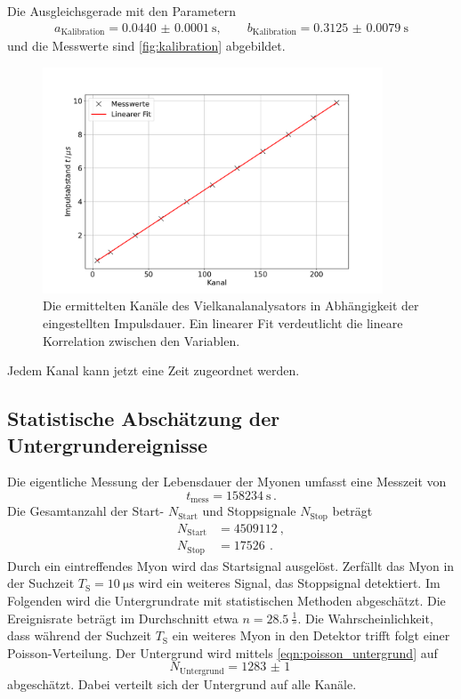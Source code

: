 Die Ausgleichsgerade mit den Parametern
\begin{align*}
    a_\text{Kalibration} = \qty{0.0440(00001)}{\second}, \qquad b_\text{Kalibration} = \qty{0.3125(00079)}{\second}
\end{align*}
und die Messwerte sind \autoref{fig:kalibration} abgebildet.
\begin{figure}
    \centering
    \includegraphics[width=0.9\textwidth]{content/plots/calibration.pdf}
    \caption{Die ermittelten Kanäle des Vielkanalanalysators in Abhängigkeit der eingestellten Impulsdauer.
    Ein linearer Fit verdeutlicht die lineare Korrelation zwischen den Variablen.
    }
    \label{fig:kalibration}
\end{figure}
Jedem Kanal kann jetzt eine Zeit zugeordnet werden.
\FloatBarrier

\subsection{Statistische Abschätzung der Untergrundereignisse}
\label{sec:untergrund}
Die eigentliche Messung der Lebensdauer der Myonen umfasst eine Messzeit von
\begin{equation*}
    t_\text{mess} = \qty{158234}{\second} \,.
\end{equation*}
Die Gesamtanzahl der Start- $N_\text{Start}$ und Stoppsignale $N_\text{Stop}$ beträgt
\begin{align*}
    N_\text{Start} &= \qty{4509112}{}, \\
    N_\text{Stop} &= \qty{17526}{} \,.
\end{align*}
Durch ein eintreffendes Myon wird das Startsignal ausgelöst.
Zerfällt das Myon in der Suchzeit $T_\text{S} = \qty{10}{\micro\second}$ wird ein weiteres Signal, das Stoppsignal detektiert.
Im Folgenden wird die Untergrundrate mit statistischen Methoden abgeschätzt.
Die Ereignisrate beträgt im Durchschnitt etwa $n = \qty{28.5}{\frac{1}{\second}}$.
Die Wahrscheinlichkeit, dass während der Suchzeit $T_\text{S}$ ein weiteres Myon in den Detektor trifft folgt einer Poisson-Verteilung.  
Der Untergrund wird mittels \autoref{eqn:poisson_untergrund} auf
\begin{equation}
    N_\text{Untergrund} = \qty{1283(1)}{}
    \label{eqn:untergrund}
\end{equation}
abgeschätzt.
Dabei verteilt sich der Untergrund auf alle Kanäle.
\FloatBarrier

